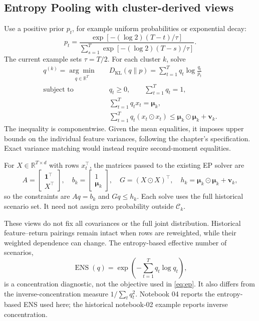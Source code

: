 \documentclass[11pt,a4paper]{article}
\begin{document}
\subsection{Entropy Pooling with cluster-derived views}

Use a positive prior \(p_t\), for example uniform probabilities or exponential decay:
\begin{equation}
p_t=
\frac{\exp[-(\log 2)(T-t)/\tau]}
{\sum_{s=1}^{T}\exp[-(\log 2)(T-s)/\tau]}.
\label{eq:prior}
\end{equation}
The current example sets \(\tau=T/2\). For each cluster \(k\), solve
\begin{equation}
\begin{aligned}
q^{(k)}=\underset{q\in\mathbb R^T}{\arg\min}\quad&
D_{\mathrm{KL}}(q\|p)
=\sum_{t=1}^{T}q_t\log\frac{q_t}{p_t}\\
\text{subject to}\quad&
q_t\geq0,\qquad \sum_{t=1}^{T}q_t=1,\\
&\sum_{t=1}^{T}q_t x_t=\boldsymbol\mu_k,\\
&\sum_{t=1}^{T}q_t(x_t\odot x_t)
\leq\boldsymbol\mu_k\odot\boldsymbol\mu_k+\boldsymbol v_k.
\end{aligned}
\label{eq:ep}
\end{equation}
The inequality is componentwise. Given the mean equalities, it imposes upper bounds on the individual feature variances, following the chapter's specification. Exact variance matching would instead require second-moment equalities.

For \(X\in\mathbb R^{T\times d}\) with rows \(x_t^\top\), the matrices passed to the existing EP solver are
\begin{equation}
A=\begin{bmatrix}\mathbf1^\top\\X^\top\end{bmatrix},
\quad b_k=\begin{bmatrix}1\\\boldsymbol\mu_k\end{bmatrix},
\quad G=(X\odot X)^\top,
\quad h_k=\boldsymbol\mu_k\odot\boldsymbol\mu_k+\boldsymbol v_k,
\end{equation}
so the constraints are \(Aq=b_k\) and \(Gq\leq h_k\). Each solve uses the full historical scenario set. It need not assign zero probability outside \(\mathcal C_k\).

These views do not fix all covariances or the full joint distribution. Historical feature--return pairings remain intact when rows are reweighted, while their weighted dependence can change. The entropy-based effective number of scenarios,
\begin{equation}
\operatorname{ENS}(q)=\exp\!\left(-\sum_{t=1}^{T}q_t\log q_t\right),
\end{equation}
is a concentration diagnostic, not the objective used in \eqref{eq:ep}. It also differs from the inverse-concentration measure \(1/\sum_t q_t^2\). Notebook 04 reports the entropy-based ENS used here; the historical notebook-02 example reports inverse concentration.
\end{document}
